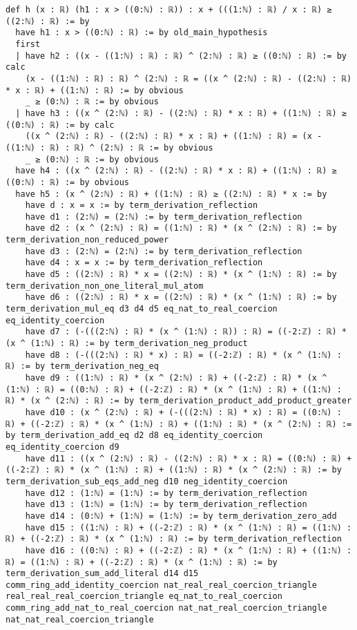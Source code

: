 \documentclass{article}
\begin{document}
\begin{tcolorbox}[colback=white!10, width=\linewidth]
\begin{lstlisting}[language=Lean4]
def h (x : ℝ) (h1 : x > ((0:ℕ) : ℝ)) : x + (((1:ℕ) : ℝ) / x : ℝ) ≥ ((2:ℕ) : ℝ) := by
  have h1 : x > ((0:ℕ) : ℝ) := by old_main_hypothesis
  first
  | have h2 : ((x - ((1:ℕ) : ℝ) : ℝ) ^ (2:ℕ) : ℝ) ≥ ((0:ℕ) : ℝ) := by calc
    (x - ((1:ℕ) : ℝ) : ℝ) ^ (2:ℕ) : ℝ = ((x ^ (2:ℕ) : ℝ) - ((2:ℕ) : ℝ) * x : ℝ) + ((1:ℕ) : ℝ) := by obvious
    _ ≥ (0:ℕ) : ℝ := by obvious
  | have h3 : ((x ^ (2:ℕ) : ℝ) - ((2:ℕ) : ℝ) * x : ℝ) + ((1:ℕ) : ℝ) ≥ ((0:ℕ) : ℝ) := by calc
    ((x ^ (2:ℕ) : ℝ) - ((2:ℕ) : ℝ) * x : ℝ) + ((1:ℕ) : ℝ) = (x - ((1:ℕ) : ℝ) : ℝ) ^ (2:ℕ) : ℝ := by obvious
    _ ≥ (0:ℕ) : ℝ := by obvious
  have h4 : ((x ^ (2:ℕ) : ℝ) - ((2:ℕ) : ℝ) * x : ℝ) + ((1:ℕ) : ℝ) ≥ ((0:ℕ) : ℝ) := by obvious
  have h5 : (x ^ (2:ℕ) : ℝ) + ((1:ℕ) : ℝ) ≥ ((2:ℕ) : ℝ) * x := by
    have d : x = x := by term_derivation_reflection
    have d1 : (2:ℕ) = (2:ℕ) := by term_derivation_reflection
    have d2 : (x ^ (2:ℕ) : ℝ) = ((1:ℕ) : ℝ) * (x ^ (2:ℕ) : ℝ) := by term_derivation_non_reduced_power
    have d3 : (2:ℕ) = (2:ℕ) := by term_derivation_reflection
    have d4 : x = x := by term_derivation_reflection
    have d5 : ((2:ℕ) : ℝ) * x = ((2:ℕ) : ℝ) * (x ^ (1:ℕ) : ℝ) := by term_derivation_non_one_literal_mul_atom
    have d6 : ((2:ℕ) : ℝ) * x = ((2:ℕ) : ℝ) * (x ^ (1:ℕ) : ℝ) := by term_derivation_mul_eq d3 d4 d5 eq_nat_to_real_coercion eq_identity_coercion
    have d7 : (-(((2:ℕ) : ℝ) * (x ^ (1:ℕ) : ℝ)) : ℝ) = ((-2:ℤ) : ℝ) * (x ^ (1:ℕ) : ℝ) := by term_derivation_neg_product
    have d8 : (-(((2:ℕ) : ℝ) * x) : ℝ) = ((-2:ℤ) : ℝ) * (x ^ (1:ℕ) : ℝ) := by term_derivation_neg_eq
    have d9 : ((1:ℕ) : ℝ) * (x ^ (2:ℕ) : ℝ) + ((-2:ℤ) : ℝ) * (x ^ (1:ℕ) : ℝ) = ((0:ℕ) : ℝ) + ((-2:ℤ) : ℝ) * (x ^ (1:ℕ) : ℝ) + ((1:ℕ) : ℝ) * (x ^ (2:ℕ) : ℝ) := by term_derivation_product_add_product_greater
    have d10 : (x ^ (2:ℕ) : ℝ) + (-(((2:ℕ) : ℝ) * x) : ℝ) = ((0:ℕ) : ℝ) + ((-2:ℤ) : ℝ) * (x ^ (1:ℕ) : ℝ) + ((1:ℕ) : ℝ) * (x ^ (2:ℕ) : ℝ) := by term_derivation_add_eq d2 d8 eq_identity_coercion eq_identity_coercion d9
    have d11 : ((x ^ (2:ℕ) : ℝ) - ((2:ℕ) : ℝ) * x : ℝ) = ((0:ℕ) : ℝ) + ((-2:ℤ) : ℝ) * (x ^ (1:ℕ) : ℝ) + ((1:ℕ) : ℝ) * (x ^ (2:ℕ) : ℝ) := by term_derivation_sub_eqs_add_neg d10 neg_identity_coercion
    have d12 : (1:ℕ) = (1:ℕ) := by term_derivation_reflection
    have d13 : (1:ℕ) = (1:ℕ) := by term_derivation_reflection
    have d14 : (0:ℕ) + (1:ℕ) = (1:ℕ) := by term_derivation_zero_add
    have d15 : ((1:ℕ) : ℝ) + ((-2:ℤ) : ℝ) * (x ^ (1:ℕ) : ℝ) = ((1:ℕ) : ℝ) + ((-2:ℤ) : ℝ) * (x ^ (1:ℕ) : ℝ) := by term_derivation_reflection
    have d16 : ((0:ℕ) : ℝ) + ((-2:ℤ) : ℝ) * (x ^ (1:ℕ) : ℝ) + ((1:ℕ) : ℝ) = ((1:ℕ) : ℝ) + ((-2:ℤ) : ℝ) * (x ^ (1:ℕ) : ℝ) := by term_derivation_sum_add_literal d14 d15 comm_ring_add_identity_coercion nat_real_real_coercion_triangle real_real_real_coercion_triangle eq_nat_to_real_coercion comm_ring_add_nat_to_real_coercion nat_nat_real_coercion_triangle nat_nat_real_coercion_triangle

\end{lstlisting}
\end{tcolorbox}
\end{document}

